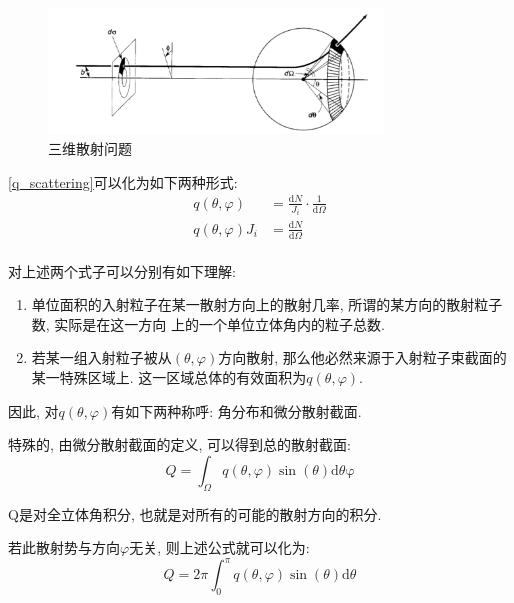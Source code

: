 \documentclass[a4paper, 11pt]{article}
\begin{document}
\begin{spacing}{1.2}
          \begin{figure}
            \centering\includegraphics[width=3.5in]{image/3D_scattering_pic}
            \caption{三维散射问题}\label{3D_scatering} 
          \end{figure}

          \eqref{q_scattering}可以化为如下两种形式:
          \begin{equation}
            \begin{aligned}
              q(\theta, \varphi) &= \frac{\mathrm{d}N}{J_i}\cdot\frac{1}{\mathrm{d}\Omega}\\
              q(\theta, \varphi)J_i &= \frac{\mathrm{d}N}{\mathrm{d}\Omega}\\
            \end{aligned}
          \end{equation}

          对上述两个式子可以分别有如下理解:
          \begin{enumerate}[*]
            \item 单位面积的入射粒子在某一散射方向上的散射几率, 所谓的某方向的散射粒子数, 实际是在这一方向
            上的一个单位立体角内的粒子总数.
            \item 若某一组入射粒子被从$(\theta, \varphi)$方向散射, 那么他必然来源于入射粒子束截面的某一特殊区域上. 
            这一区域总体的有效面积为$q(\theta, \varphi)$.
          \end{enumerate}
        
          因此, 对$q(\theta, \varphi)$有如下两种称呼: 角分布和微分散射截面.
          
          特殊的, 由微分散射截面的定义, 可以得到总的散射截面:
          \begin{equation}
            Q = \int_{\Omega}q(\theta, \varphi) \sin(\theta)\mathrm{d}\theta\mathrm{\varphi}
          \end{equation}
          
          Q是对全立体角积分, 也就是对所有的可能的散射方向的积分.
          
          若此散射势与方向$\varphi$无关, 则上述公式就可以化为:
          \begin{equation}
            Q = 2\pi\int_0^{\pi}q(\theta, \varphi)\sin(\theta)\mathrm{d}\theta
          \end{equation}


\end{spacing}
\end{document}

